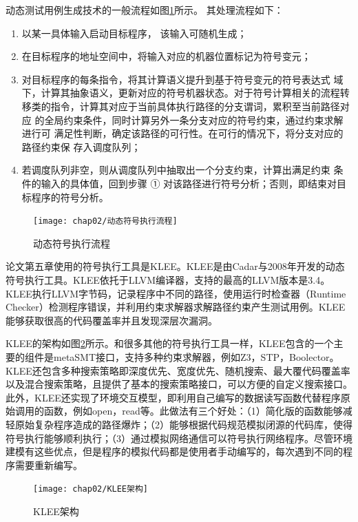 动态测试用例生成技术的一般流程如图\ref{动态符号执行流程}所示。 其处理流程如下：
\begin{enumerate}[(1)]
\item 以某一具体输入启动目标程序， 该输入可随机生成；
\item 在目标程序的地址空间中，将输入对应的机器位置标记为符号变元；
\item 对目标程序的每条指令，将其计算语义提升到基于符号变元的符号表达式
域下，计算其抽象语义，更新对应的符号机器状态。对于符号计算相关的流程转
移类的指令，计算其对应于当前具体执行路径的分支谓词，累积至当前路径对应
的全局约束条件，同时计算另外一条分支对应的符号约束，通过约束求解进行可
满足性判断，确定该路径的可行性。在可行的情况下，将分支对应的路径约束保
存入调度队列；
\item 若调度队列非空，则从调度队列中抽取出一个分支约束，计算出满足约束
条件的输入的具体值，回到步骤 ① 对该路径进行符号分析；否则，即结束对目
标程序的符号分析。
\end{enumerate}

\begin{figure}[h]
\begin{center}
\texttt{[image: chap02/动态符号执行流程]}
\end{center}
\caption{动态符号执行流程}
\label{动态符号执行流程}
\end{figure}

论文第五章使用的符号执行工具是KLEE。KLEE是由Cadar与2008年开发的动态符号执行工具。KLEE依托于LLVM编译器，支持的最高的LLVM版本是3.4。KLEE执行LLVM字节码，记录程序中不同的路径，使用运行时检查器（Runtime Checker）检测程序错误，并利用约束求解器求解路径约束产生测试用例。KLEE能够获取很高的代码覆盖率并且发现深层次漏洞。

KLEE的架构如图\ref{KLEE架构}所示。和很多其他的符号执行工具一样，KLEE包含的一个主要的组件是metaSMT接口，支持多种约束求解器，例如Z3，STP，Boolector。KLEE还包含多种搜索策略即深度优先、宽度优先、随机搜索、最大覆代码覆盖率以及混合搜索策略，且提供了基本的搜索策略接口，可以方便的自定义搜索接口。此外，KLEE还实现了环境交互模型，即利用自己编写的数据读写函数代替程序原始调用的函数，例如open，read等。此做法有三个好处：（1）简化版的函数能够减轻原始复杂程序造成的路径爆炸；（2）能够根据代码规范模拟闭源的代码库，使得符号执行能够顺利执行；（3）通过模拟网络通信可以符号执行网络程序。尽管环境建模有这些优点，但是程序的模拟代码都是使用者手动编写的，每次遇到不同的程序需要重新编写。

\begin{figure}[h]
\begin{center}
\texttt{[image: chap02/KLEE架构]}
\end{center}
\caption{KLEE架构}
\label{KLEE架构}
\end{figure}


